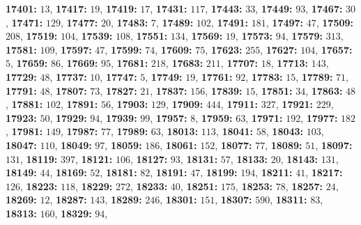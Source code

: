 \textsf{\bfseries 17401:} $13$, \textsf{\bfseries 17417:} $19$, \textsf{\bfseries 17419:} $17$, \textsf{\bfseries 17431:} $117$, \textsf{\bfseries 17443:} $33$, \textsf{\bfseries 17449:} $93$, \textsf{\bfseries 17467:} $30$, \textsf{\bfseries 17471:} $129$, \textsf{\bfseries 17477:} $20$, \textsf{\bfseries 17483:} $7$, \textsf{\bfseries 17489:} $102$, \textsf{\bfseries 17491:} $181$, \textsf{\bfseries 17497:} $47$, \textsf{\bfseries 17509:} $208$, \textsf{\bfseries 17519:} $104$, \textsf{\bfseries 17539:} $108$, \textsf{\bfseries 17551:} $134$, \textsf{\bfseries 17569:} $19$, \textsf{\bfseries 17573:} $94$, \textsf{\bfseries 17579:} $313$, \textsf{\bfseries 17581:} $109$, \textsf{\bfseries 17597:} $47$, \textsf{\bfseries 17599:} $74$, \textsf{\bfseries 17609:} $75$, \textsf{\bfseries 17623:} $255$, \textsf{\bfseries 17627:} $104$, \textsf{\bfseries 17657:} $5$, \textsf{\bfseries 17659:} $86$, \textsf{\bfseries 17669:} $95$, \textsf{\bfseries 17681:} $218$, \textsf{\bfseries 17683:} $211$, \textsf{\bfseries 17707:} $18$, \textsf{\bfseries 17713:} $143$, \textsf{\bfseries 17729:} $48$, \textsf{\bfseries 17737:} $10$, \textsf{\bfseries 17747:} $5$, \textsf{\bfseries 17749:} $19$, \textsf{\bfseries 17761:} $92$, \textsf{\bfseries 17783:} $15$, \textsf{\bfseries 17789:} $71$, \textsf{\bfseries 17791:} $48$, \textsf{\bfseries 17807:} $73$, \textsf{\bfseries 17827:} $21$, \textsf{\bfseries 17837:} $156$, \textsf{\bfseries 17839:} $15$, \textsf{\bfseries 17851:} $34$, \textsf{\bfseries 17863:} $48$, \textsf{\bfseries 17881:} $102$, \textsf{\bfseries 17891:} $56$, \textsf{\bfseries 17903:} $129$, \textsf{\bfseries 17909:} $444$, \textsf{\bfseries 17911:} $327$, \textsf{\bfseries 17921:} $229$, \textsf{\bfseries 17923:} $50$, \textsf{\bfseries 17929:} $94$, \textsf{\bfseries 17939:} $99$, \textsf{\bfseries 17957:} $8$, \textsf{\bfseries 17959:} $63$, \textsf{\bfseries 17971:} $192$, \textsf{\bfseries 17977:} $182$, \textsf{\bfseries 17981:} $149$, \textsf{\bfseries 17987:} $77$, \textsf{\bfseries 17989:} $63$, \textsf{\bfseries 18013:} $113$, \textsf{\bfseries 18041:} $58$, \textsf{\bfseries 18043:} $103$, \textsf{\bfseries 18047:} $110$, \textsf{\bfseries 18049:} $97$, \textsf{\bfseries 18059:} $186$, \textsf{\bfseries 18061:} $152$, \textsf{\bfseries 18077:} $77$, \textsf{\bfseries 18089:} $51$, \textsf{\bfseries 18097:} $131$, \textsf{\bfseries 18119:} $397$, \textsf{\bfseries 18121:} $106$, \textsf{\bfseries 18127:} $93$, \textsf{\bfseries 18131:} $57$, \textsf{\bfseries 18133:} $20$, \textsf{\bfseries 18143:} $131$, \textsf{\bfseries 18149:} $44$, \textsf{\bfseries 18169:} $52$, \textsf{\bfseries 18181:} $82$, \textsf{\bfseries 18191:} $47$, \textsf{\bfseries 18199:} $194$, \textsf{\bfseries 18211:} $41$, \textsf{\bfseries 18217:} $126$, \textsf{\bfseries 18223:} $118$, \textsf{\bfseries 18229:} $272$, \textsf{\bfseries 18233:} $40$, \textsf{\bfseries 18251:} $175$, \textsf{\bfseries 18253:} $78$, \textsf{\bfseries 18257:} $24$, \textsf{\bfseries 18269:} $12$, \textsf{\bfseries 18287:} $143$, \textsf{\bfseries 18289:} $246$, \textsf{\bfseries 18301:} $151$, \textsf{\bfseries 18307:} $590$, \textsf{\bfseries 18311:} $83$, \textsf{\bfseries 18313:} $160$, \textsf{\bfseries 18329:} $94$, 
